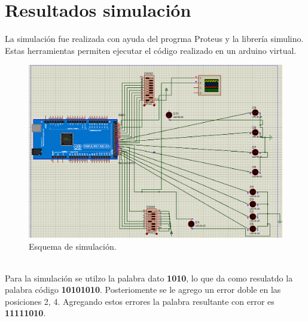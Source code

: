 \documentclass[12pt,letterpaper]{article}
\begin{document}
\section{Resultados simulación}
La simulación fue realizada con ayuda del progrma Proteus y la librería simulino. Estas 
herramientas permiten ejecutar el código realizado en un arduino virtual.
\begin{figure}[ht]
    \centering
    \includegraphics[width=1\textwidth]{simu0.png}
    \caption{Esquema de simulación.}
\end{figure}
\\
Para la simulación se utilzo la palabra dato \textbf{1010}, lo que da como resulatdo la palabra 
código \textbf{10101010}. Posteriomente se le agrego un error doble en las posiciones 2, 4. 
Agregando estos errores la palabra resultante con error es \textbf{11111010}.
\end{document}
